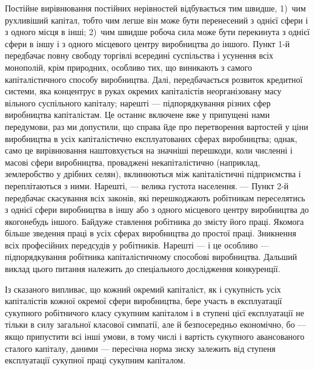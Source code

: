 Постійне вирівнювання постійних нерівностей відбувається
тим швидше, 1)~чим рухливіший капітал, тобто чим легше він
може бути перенесений з однієї сфери і з одного місця в інші;
2)~чим швидше робоча сила може бути перекинута з однієї
сфери в іншу і з одного місцевого центру виробництва до
іншого. Пункт 1-й передбачає повну свободу торгівлі всередині
суспільства і усунення всіх монополій, крім природних, особливо
тих, що виникають з самого капіталістичного способу виробництва.
Далі, передбачається розвиток кредитної системи, яка
концентрує в руках окремих капіталістів неорганізовану масу
вільного суспільного капіталу; нарешті — підпорядкування різних
сфер виробництва капіталістам. Це останнє включене вже
у припущені нами передумови, раз ми допустили, що справа
йде про перетворення вартостей у ціни виробництва в усіх капіталістично
експлуатованих сферах виробництва; однак, само
це вирівнювання наштовхується на значніші перешкоди, коли
численні і масові сфери виробництва, проваджені некапіталістично
(наприклад, землеробство у дрібних селян), вклинюються
між капіталістичні підприємства і переплітаються з ними. Нарешті,
— велика густота населення. — Пункт 2-й передбачає скасування
всіх законів, які перешкоджають робітникам переселятись
з однієї сфери виробництва в іншу або з одного місцевого
центру виробництва до якогонебудь іншого. Байдуже ставлення
робітника до змісту його праці. Якомога більше зведення праці
в усіх сферах виробництва до простої праці. Зникнення всіх професійних
передсудів у робітників. Нарешті — і це особливо —
підпорядкування робітника капіталістичному способові виробництва.
Дальший виклад цього питання належить до спеціального
дослідження конкуренції.

Із сказаного випливає, що кожний окремий капіталіст, як
і сукупність усіх капіталістів кожної окремої сфери виробництва,
бере участь в експлуатації сукупного робітничого класу сукупним
капіталом і в ступені цієї експлуатації не тільки в силу
загальної класової симпатії, але й безпосередньо економічно,
бо — якщо припустити всі інші умови, в тому числі і вартість
сукупного авансованого сталого капіталу, даними — пересічна
норма зиску залежить від ступеня експлуатації сукупної
праці сукупним капіталом.

